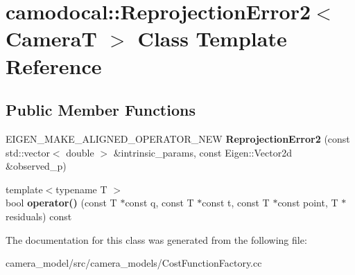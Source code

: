 \hypertarget{classcamodocal_1_1ReprojectionError2}{}\section{camodocal\+:\+:Reprojection\+Error2$<$ CameraT $>$ Class Template Reference}
\label{classcamodocal_1_1ReprojectionError2}
\subsection*{Public Member Functions}
\begin{DoxyCompactItemize}
\item 
\mbox{\label{classcamodocal_1_1ReprojectionError2_a444e4d57ab5e34047beed0cf78e5462b}} 
E\+I\+G\+E\+N\+\_\+\+M\+A\+K\+E\+\_\+\+A\+L\+I\+G\+N\+E\+D\+\_\+\+O\+P\+E\+R\+A\+T\+O\+R\+\_\+\+N\+EW {\bfseries Reprojection\+Error2} (const std\+::vector$<$ double $>$ \&intrinsic\+\_\+params, const Eigen\+::\+Vector2d \&observed\+\_\+p)
\item 
\mbox{\label{classcamodocal_1_1ReprojectionError2_aac1d5bba42962b76ba6e89cdbf598a86}} 
{\footnotesize template$<$typename T $>$ }\\bool {\bfseries operator()} (const T $\ast$const q, const T $\ast$const t, const T $\ast$const point, T $\ast$residuals) const
\end{DoxyCompactItemize}


The documentation for this class was generated from the following file\+:\begin{DoxyCompactItemize}
\item 
camera\+\_\+model/src/camera\+\_\+models/Cost\+Function\+Factory.\+cc\end{DoxyCompactItemize}
